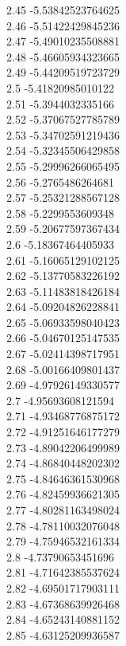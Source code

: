 {2.45	-5.53842523764625\\
2.46	-5.51422429845236\\
2.47	-5.49010235508881\\
2.48	-5.46605934323665\\
2.49	-5.44209519723729\\
2.5	-5.41820985010122\\
2.51	-5.3944032335166\\
2.52	-5.37067527785789\\
2.53	-5.34702591219436\\
2.54	-5.32345506429858\\
2.55	-5.29996266065495\\
2.56	-5.2765486264681\\
2.57	-5.25321288567128\\
2.58	-5.2299553609348\\
2.59	-5.20677597367434\\
2.6	-5.18367464405933\\
2.61	-5.16065129102125\\
2.62	-5.13770583226192\\
2.63	-5.11483818426184\\
2.64	-5.09204826228841\\
2.65	-5.06933598040423\\
2.66	-5.04670125147535\\
2.67	-5.02414398717951\\
2.68	-5.00166409801437\\
2.69	-4.97926149330577\\
2.7	-4.95693608121594\\
2.71	-4.93468776875172\\
2.72	-4.91251646177279\\
2.73	-4.89042206499989\\
2.74	-4.86840448202302\\
2.75	-4.84646361530968\\
2.76	-4.82459936621305\\
2.77	-4.80281163498024\\
2.78	-4.78110032076048\\
2.79	-4.75946532161334\\
2.8	-4.73790653451696\\
2.81	-4.71642385537624\\
2.82	-4.69501717903111\\
2.83	-4.67368639926468\\
2.84	-4.65243140881152\\
2.85	-4.63125209936587\\
}

